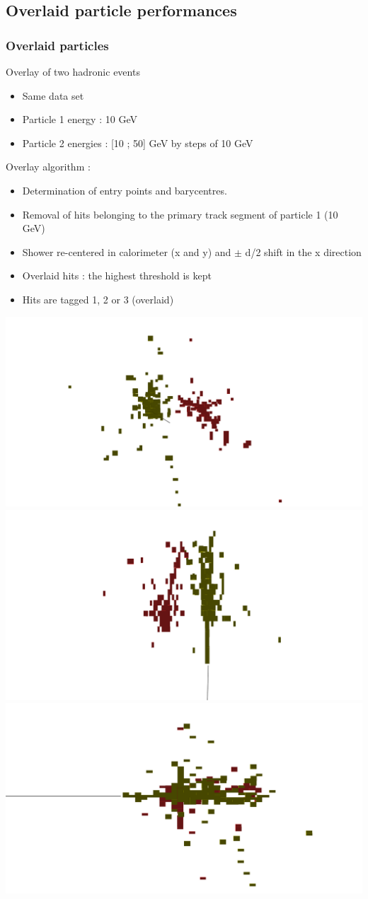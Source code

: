 \documentclass[8pt]{beamer}
\begin{document}
  \subsection{Overlaid particle performances}
  \begin{frame}
  \frametitle{Overlaid particles}
    \begin{block}{Overlay of two hadronic events}
      \begin{itemize}
        \item Same data set
        \item Particle 1 energy : 10 GeV
        \item Particle 2 energies : [10 ; 50] GeV by steps of 10 GeV
      \end{itemize}
      Overlay algorithm :
      \begin{itemize}
        \item Determination of entry points and barycentres.
        \item Removal of hits belonging to the primary track segment of particle 1 (10 GeV)
        \item Shower re-centered in calorimeter (x and y) and $\pm$ d/2 shift in the x direction
        \item Overlaid hits : the highest threshold is kept
        \item Hits are tagged 1, 2 or 3 (overlaid)
      \end{itemize}
    \end{block}
    \includegraphics[width=0.32\linewidth]{ArborPFA_PandoraMonitoring_SDHCAL_Overlay_XY.pdf}
    \includegraphics[width=0.32\linewidth]{ArborPFA_PandoraMonitoring_SDHCAL_Overlay_XZ.pdf}
    \includegraphics[width=0.32\linewidth]{ArborPFA_PandoraMonitoring_SDHCAL_Overlay_YZ.pdf}
  \end{frame}
  
\end{document}

